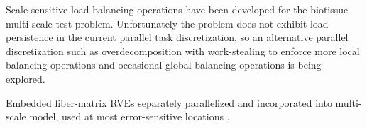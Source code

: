 \documentclass[11pt]{siamltex1213}
\begin{document}
Scale-sensitive load-balancing operations have been developed for the biotissue multi-scale test problem. Unfortunately the problem does not exhibit load persistence in the current parallel task discretization, so an alternative parallel discretization such as overdecomposition with work-stealing to enforce more local balancing operations and occasional global balancing operations is being explored.

Embedded fiber-matrix RVEs separately parallelized and incorporated into multi-scale model, used at most error-sensitive locations \cite{lake2012mechanics} \cite{zhang2013cross} \cite{zhang2013coupled}.


\end{document}
